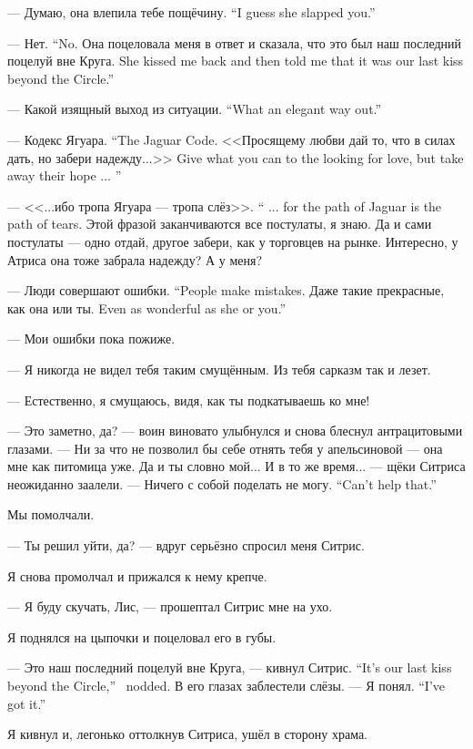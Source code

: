 {--- Думаю, она влепила тебе пощёчину.}
{``I guess she slapped you.''}

{--- Нет.}
{``No.}
{Она поцеловала меня в ответ и сказала, что это был наш последний поцелуй вне Круга.}
{She kissed me back and then told me that it was our last kiss beyond the Circle.''}

{--- Какой изящный выход из ситуации.}
{``What an elegant way out.''}

{--- Кодекс Ягуара.}
{``The Jaguar Code.}
{<<Просящему любви дай то, что в силах дать, но забери надежду...>>}
{Give what you can to the looking for love, but take away their hope ... ''}

{--- <<...ибо тропа Ягуара --- тропа слёз>>.}
{`` ... for the path of Jaguar is the path of tears.}
Этой фразой заканчиваются все постулаты, я знаю.
Да и сами постулаты --- одно отдай, другое забери, как у торговцев на рынке.
Интересно, у Атриса она тоже забрала надежду?
А у меня?

{--- Люди совершают ошибки.}
{``People make mistakes.}
{Даже такие прекрасные, как она или ты.}
{Even as wonderful as she or you.''}

--- Мои ошибки пока пожиже.

--- Я никогда не видел тебя таким смущённым.
Из тебя сарказм так и лезет.

--- Естественно, я смущаюсь, видя, как ты подкатываешь ко мне!

--- Это заметно, да? --- воин виновато улыбнулся и снова блеснул антрацитовыми глазами.
--- Ни за что не позволил бы себе отнять тебя у апельсиновой --- она мне как питомица уже.
Да и ты словно мой...
И в то же время... --- щёки Ситриса неожиданно заалели.
{--- Ничего с собой поделать не могу.}
{``Can't help that.''}

Мы помолчали.

--- Ты решил уйти, да? --- вдруг серьёзно спросил меня Ситрис.

Я снова промолчал и прижался к нему крепче.

--- Я буду скучать, Лис, --- прошептал Ситрис мне на ухо.

Я поднялся на цыпочки и поцеловал его в губы.

{--- Это наш последний поцелуй вне Круга, --- кивнул Ситрис.}
{``It's our last kiss beyond the Circle,'' \Sitris\ nodded.}
В его глазах заблестели слёзы.
{--- Я понял.}
{``I've got it.''}

Я кивнул и, легонько оттолкнув Ситриса, ушёл в сторону храма.

